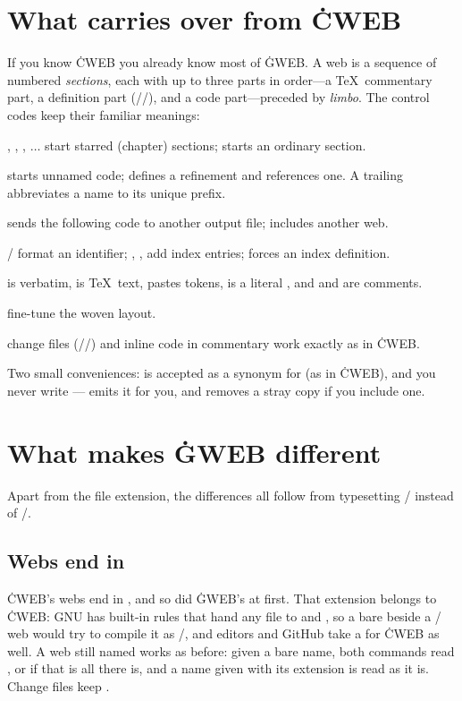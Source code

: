 \chapter{What carries over from \.{CWEB}}
\noindent
If you know \.{CWEB} you already know most of \.{GWEB}. A web is a sequence of numbered
{\it sections}, each with up to three parts in order---a \TeX\ commentary
part, a definition part (//), and a code part---preceded
by {\it limbo}. The control codes keep their familiar meanings:

\bull {}, , , $\ldots$ start starred (chapter) sections;
 starts an ordinary section.

\bull {} starts unnamed code;  defines a refinement and
 references one. A trailing  abbreviates a name to its
unique prefix.

\bull {} sends the following code to another output file; 
includes another web.

\bull {}/ format an identifier; , ,
 add index entries;  forces an index definition.

\bull {} is verbatim,  is \TeX\ text,  pastes
tokens,  is a literal , and  and  are
comments.

\bull {}    fine-tune the woven layout.

\bull change files (//) and inline code  in
commentary work exactly as in \.{CWEB}.

\noindent Two small conveniences:  is accepted as a synonym for 
(as in \.{CWEB}), and you never write --- emits it
for you, and removes a stray copy if you include one.

\chapter{What makes \.{GWEB} different}
\noindent Apart from the file extension, the differences all follow from typesetting
\GO/ instead of \CEE/.

\section{Webs end in }
\.{CWEB}'s webs end in , and so did \.{GWEB}'s at first. That extension
belongs to \.{CWEB}: GNU  has built-in rules that hand any  file to
 and , so a bare  beside a \GO/ web 
would try to compile it as \CEE/, and editors and GitHub take a  for \.{CWEB}
as well. A web still named  works as before: given a bare name, both
commands read , or  if that is all there is, and a name given
with its extension is read as it is. Change files keep .

